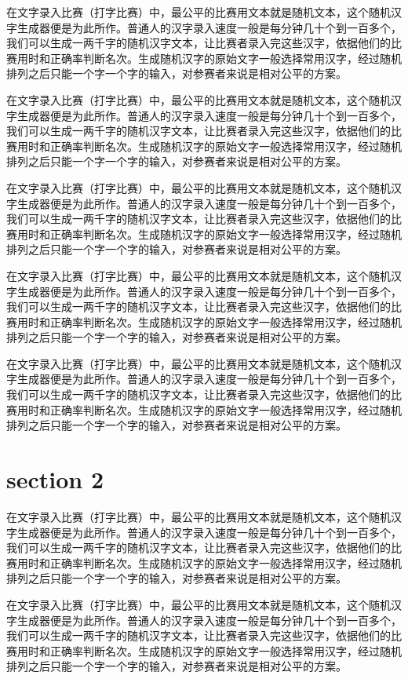 \documentclass[12pt,hyperref,UTF8]{ctexbook}
\begin{document}
在文字录入比赛（打字比赛）中，最公平的比赛用文本就是随机文本，这个随机汉字生成器便是为此所作。普通人的汉字录入速度一般是每分钟几十个到一百多个，我们可以生成一两千字的随机汉字文本，让比赛者录入完这些汉字，依据他们的比赛用时和正确率判断名次。生成随机汉字的原始文字一般选择常用汉字，经过随机排列之后只能一个字一个字的输入，对参赛者来说是相对公平的方案。

在文字录入比赛（打字比赛）中，最公平的比赛用文本就是随机文本，这个随机汉字生成器便是为此所作。普通人的汉字录入速度一般是每分钟几十个到一百多个，我们可以生成一两千字的随机汉字文本，让比赛者录入完这些汉字，依据他们的比赛用时和正确率判断名次。生成随机汉字的原始文字一般选择常用汉字，经过随机排列之后只能一个字一个字的输入，对参赛者来说是相对公平的方案。

在文字录入比赛（打字比赛）中，最公平的比赛用文本就是随机文本，这个随机汉字生成器便是为此所作。普通人的汉字录入速度一般是每分钟几十个到一百多个，我们可以生成一两千字的随机汉字文本，让比赛者录入完这些汉字，依据他们的比赛用时和正确率判断名次。生成随机汉字的原始文字一般选择常用汉字，经过随机排列之后只能一个字一个字的输入，对参赛者来说是相对公平的方案。

在文字录入比赛（打字比赛）中，最公平的比赛用文本就是随机文本，这个随机汉字生成器便是为此所作。普通人的汉字录入速度一般是每分钟几十个到一百多个，我们可以生成一两千字的随机汉字文本，让比赛者录入完这些汉字，依据他们的比赛用时和正确率判断名次。生成随机汉字的原始文字一般选择常用汉字，经过随机排列之后只能一个字一个字的输入，对参赛者来说是相对公平的方案。

在文字录入比赛（打字比赛）中，最公平的比赛用文本就是随机文本，这个随机汉字生成器便是为此所作。普通人的汉字录入速度一般是每分钟几十个到一百多个，我们可以生成一两千字的随机汉字文本，让比赛者录入完这些汉字，依据他们的比赛用时和正确率判断名次。生成随机汉字的原始文字一般选择常用汉字，经过随机排列之后只能一个字一个字的输入，对参赛者来说是相对公平的方案。

\section{section 2}

在文字录入比赛（打字比赛）中，最公平的比赛用文本就是随机文本，这个随机汉字生成器便是为此所作。普通人的汉字录入速度一般是每分钟几十个到一百多个，我们可以生成一两千字的随机汉字文本，让比赛者录入完这些汉字，依据他们的比赛用时和正确率判断名次。生成随机汉字的原始文字一般选择常用汉字，经过随机排列之后只能一个字一个字的输入，对参赛者来说是相对公平的方案。

在文字录入比赛（打字比赛）中，最公平的比赛用文本就是随机文本，这个随机汉字生成器便是为此所作。普通人的汉字录入速度一般是每分钟几十个到一百多个，我们可以生成一两千字的随机汉字文本，让比赛者录入完这些汉字，依据他们的比赛用时和正确率判断名次。生成随机汉字的原始文字一般选择常用汉字，经过随机排列之后只能一个字一个字的输入，对参赛者来说是相对公平的方案。
\end{document}
